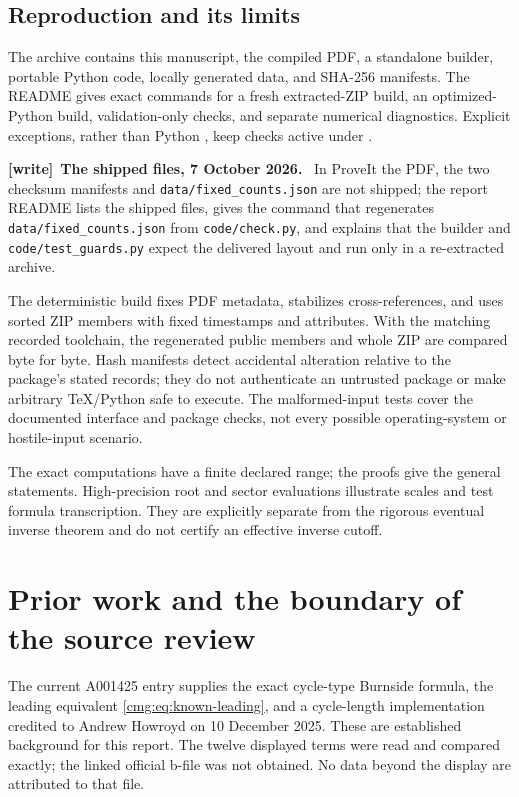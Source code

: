 \documentclass[11pt,letterpaper]{article}
\numberwithin{equation}{section}
\theoremstyle{definition}\newtheorem{definition}[theorem]{Definition}
\theoremstyle{remark}\newtheorem{remark}[theorem]{Remark}
\newcommand{\code}[1]{\texttt{\detokenize{#1}}}
\newcommand{\file}[1]{\nolinkurl{#1}}
\newenvironment{writenote}[1][]{\par\smallskip\begingroup\small
 \noindent\textbf{[write]}\if\relax\detokenize{#1}\relax\else~\textbf{#1.}\fi\ }%
 {\par\endgroup\smallskip}
\begin{document}
\subsection{Reproduction and its limits}
The archive contains this manuscript, the compiled PDF, a standalone builder, portable Python code, locally generated data, and SHA-256 manifests. The README gives exact commands for a fresh extracted-ZIP build, an optimized-Python build, validation-only checks, and separate numerical diagnostics. Explicit exceptions, rather than Python \code{assert}, keep checks active under \code{python -O}.
\begin{writenote}[The shipped files, 7 October 2026]
In ProveIt the PDF, the two checksum manifests and \file{data/fixed_counts.json}
are not shipped; the report README lists the shipped files, gives the
command that regenerates \file{data/fixed_counts.json} from \file{code/check.py},
and explains that the builder and \file{code/test_guards.py} expect the
delivered layout and run only in a re-extracted archive.
\end{writenote}

The deterministic build fixes PDF metadata, stabilizes cross-references, and uses sorted ZIP members with fixed timestamps and attributes. With the matching recorded toolchain, the regenerated public members and whole ZIP are compared byte for byte. Hash manifests detect accidental alteration relative to the package's stated records; they do not authenticate an untrusted package or make arbitrary TeX/Python safe to execute. The malformed-input tests cover the documented interface and package checks, not every possible operating-system or hostile-input scenario.

The exact computations have a finite declared range; the proofs give the general statements. High-precision root and sector evaluations illustrate scales and test formula transcription. They are explicitly separate from the rigorous eventual inverse theorem and do not certify an effective inverse cutoff.

\section{Prior work and the boundary of the source review}\label{cmg:sec:sources}
The current A001425 entry \cite{oeis} supplies the exact cycle-type Burnside formula, the leading equivalent \eqref{cmg:eq:known-leading}, and a cycle-length implementation credited to Andrew Howroyd on 10 December 2025. These are established background for this report. The twelve displayed terms were read and compared exactly; the linked official b-file was not obtained. No data beyond the display are attributed to that file.
\end{document}
